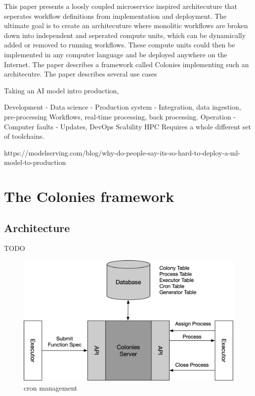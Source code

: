 \documentclass{article}
\begin{document}
This paper presents a loosly coupled microservice inspired architecuture that seperates workflow definitions from implementation and deployment. The ultimate goal is to create an architecuture where monolitic workflows are broken down into independent and seperated compute units, which can be dynamically added or removed to running workflows. These compute units could then be implemented in any computer language and be deployed anywhere on the Internet. The paper describes a framework called Colonies implementing such an architecutre. The paper describes several use cases   

Taking an AI model intro production, 

Development
 - Data science
 - Production system
 - Integration, data ingestion, pre-processing
 Workflows, real-time processing, back processing.
Operation
 - Computer faults
 - Updates, DevOps
Scability
HPC
 Requires a whole different set of toolchains. 

 


https://modelserving.com/blog/why-do-people-say-its-so-hard-to-deploy-a-ml-model-to-production
\section{The Colonies framework}
\label{sec:headings}

\subsection{Architecture}
TODO
\begin{figure}[h]
	\centering
    \includegraphics[scale=0.4]{arch.png}
	\caption{cron management}
	\label{fig:fig1}
\end{figure}
\end{document}
